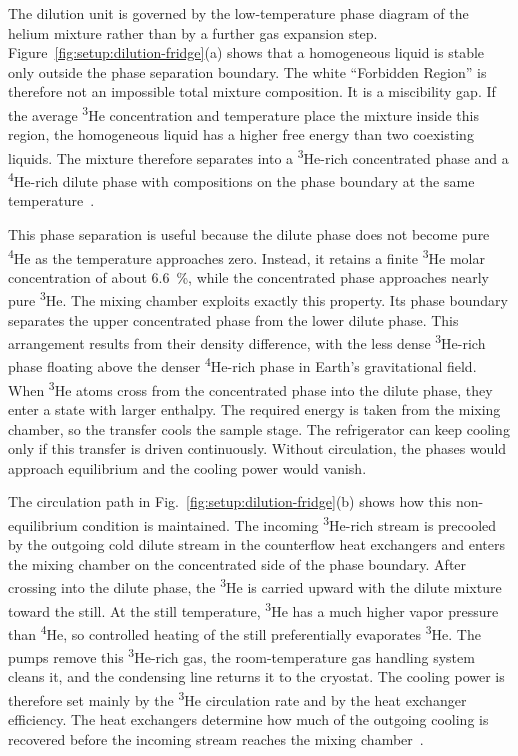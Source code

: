         The dilution unit is governed by the low-temperature phase diagram of the helium mixture rather than by a further gas expansion step. Figure~\ref{fig:setup:dilution-fridge}(a) shows that a homogeneous liquid is stable only outside the phase separation boundary. The white ``Forbidden Region'' is therefore not an impossible total mixture composition. It is a miscibility gap. If the average \textsuperscript{3}He concentration and temperature place the mixture inside this region, the homogeneous liquid has a higher free energy than two coexisting liquids. The mixture therefore separates into a \textsuperscript{3}He-rich concentrated phase and a \textsuperscript{4}He-rich dilute phase with compositions on the phase boundary at the same temperature~\cite{radebaugh_thermodynamic_1967,pobell_matter_2007}.

        This phase separation is useful because the dilute phase does not become pure \textsuperscript{4}He as the temperature approaches zero. Instead, it retains a finite \textsuperscript{3}He molar concentration of about \qty{6.6}{\percent}, while the concentrated phase approaches nearly pure \textsuperscript{3}He. The mixing chamber exploits exactly this property. Its phase boundary separates the upper concentrated phase from the lower dilute phase. This arrangement results from their density difference, with the less dense \textsuperscript{3}He-rich phase floating above the denser \textsuperscript{4}He-rich phase in Earth's gravitational field. When \textsuperscript{3}He atoms cross from the concentrated phase into the dilute phase, they enter a state with larger enthalpy. The required energy is taken from the mixing chamber, so the transfer cools the sample stage. The refrigerator can keep cooling only if this transfer is driven continuously. Without circulation, the phases would approach equilibrium and the cooling power would vanish.

        The circulation path in Fig.~\ref{fig:setup:dilution-fridge}(b) shows how this non-equilibrium condition is maintained. The incoming \textsuperscript{3}He-rich stream is precooled by the outgoing cold dilute stream in the counterflow heat exchangers and enters the mixing chamber on the concentrated side of the phase boundary. After crossing into the dilute phase, the \textsuperscript{3}He is carried upward with the dilute mixture toward the still. At the still temperature, \textsuperscript{3}He has a much higher vapor pressure than \textsuperscript{4}He, so controlled heating of the still preferentially evaporates \textsuperscript{3}He. The pumps remove this \textsuperscript{3}He-rich gas, the room-temperature gas handling system cleans it, and the condensing line returns it to the cryostat. The cooling power is therefore set mainly by the \textsuperscript{3}He circulation rate and by the heat exchanger efficiency. The heat exchangers determine how much of the outgoing cooling is recovered before the incoming stream reaches the mixing chamber~\cite{de_waele_basic_2011,pobell_matter_2007}.

